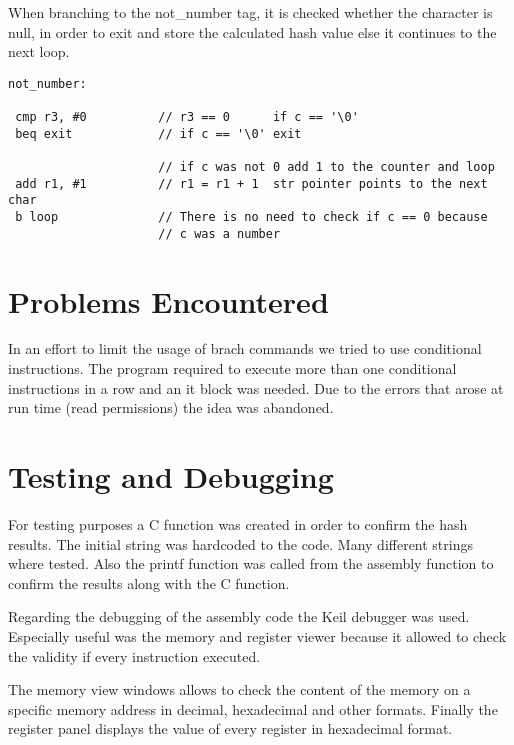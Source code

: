 \documentclass[a4paper, 12pt]{report}
\begin{document}
    When branching to the not\_number tag, it is checked whether the character is null, in order to exit and store 
    the calculated hash value else it continues to the next loop.
    
    \begin{lstlisting}[language = assembly]
 not_number:
		
 cmp r3, #0          // r3 == 0      if c == '\0'
 beq exit            // if c == '\0' exit
			
                     // if c was not 0 add 1 to the counter and loop
 add r1, #1          // r1 = r1 + 1  str pointer points to the next char
 b loop              // There is no need to check if c == 0 because 
                     // c was a number
    \end{lstlisting}

    \section*{Problems Encountered}

    In an effort to limit the usage of brach commands we tried to use conditional instructions. The program required
    to execute more than one conditional instructions in a row and an it block was needed. Due to the errors that 
    arose at run time (read permissions) the idea was abandoned.

    \section*{Testing and Debugging}

    For testing purposes a C function was created in order to confirm the hash results. The initial string was hardcoded
    to the code. Many different strings where tested. Also the printf function was called from the assembly function to 
    confirm the results along with the C function. 
    
    Regarding the debugging of the assembly code the Keil debugger was used. Especially useful was the memory and register viewer because it allowed 
    to check the validity if every instruction executed. 

    The memory view windows allows to check the content of the memory on a specific memory address in decimal, 
    hexadecimal and other formats. Finally the register panel displays the value of every register in hexadecimal
    format.

    
\end{document}
